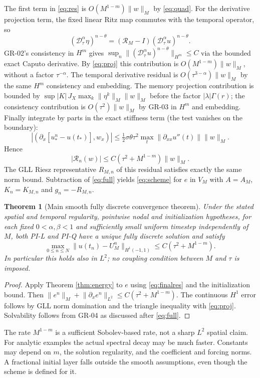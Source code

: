 \documentclass[11pt,a4paper]{article}
\newtheorem{theorem}{Theorem}
\newcommand{\norm}[1]{\lVert#1\rVert}
\newcommand{\D}{\mathcal D_\tau^\alpha}
\begin{document}
The first term in \eqref{eq:res} is $O(M^{1-m})\norm{w}_M$ by \eqref{eq:quad}. For the derivative projection term, the fixed linear Ritz map commutes with the temporal operator, so
\[
 (\D\eta)^{n-\theta}=(\mathcal R_M-I)(\D u)^{n-\theta}.
\]
GR-02's consistency in $H^m$ gives $\sup_n\norm{(\D u)^{n-\theta}}_{H^m}\le C$ via the bounded exact Caputo derivative. By \eqref{eq:proj} this contribution is $O(M^{1-m})\norm{w}_M$, without a factor $\tau^{-\alpha}$. The temporal derivative residual is $O(\tau^{3-\alpha})\norm{w}_M$ by the same $H^m$ consistency and embedding. The memory projection contribution is bounded by $\sup|K|\,J_X\max_k\norm{\eta^k}_M\norm{w}_M$ before the factor $|\lambda|\Gamma(r)$; the consistency contribution is $O(\tau^2)\norm{w}_M$ by GR-03 in $H^m$ and embedding. Finally integrate by parts in the exact stiffness term (the test vanishes on the boundary):
\[
 |(\partial_x[u_*^n-u(t_*)],w_x)|
 \le\tfrac12\sigma\theta\tau^2\max_t\norm{\partial_{xx}u''(t)}\norm{w}_M.
\]
Hence
\begin{equation}\label{eq:finalres}
 |\mathcal R_n(w)|\le C(\tau^2+M^{1-m})\norm{w}_M.
\end{equation}
The GLL Riesz representative $R_{M,n}$ of this residual satisfies exactly the same norm bound. Subtraction of \eqref{eq:full} yields \eqref{eq:scheme} for $e$ in $V_M$ with $A=A_M$, $K_n=K_{M,n}$ and $g_n=-R_{M,n}$.
\begin{theorem}[Main smooth fully discrete convergence theorem]\label{thm:full}
Under the stated spatial and temporal regularity, pointwise nodal and initialization hypotheses, for each fixed $0<\alpha,\beta<1$ and sufficiently small uniform timestep independently of $M$, both PI-L and PI-Q have a unique fully discrete solution and satisfy
\[
 \max_{0\le n\le N}\norm{u(t_n)-U_M^n}_{H^1(-1,1)}
 \le C(\tau^2+M^{1-m}).
\]
In particular this holds also in $L^2$; no coupling condition between $M$ and $\tau$ is imposed.
\end{theorem}
\begin{proof}
Apply Theorem \ref{thm:energy} to $e$ using \eqref{eq:finalres} and the initialization bound. Then $\norm{e^n}_M+\norm{\partial_x e^n}_{L^2}\le C(\tau^2+M^{1-m})$. The continuous $H^1$ error follows by GLL norm domination and the triangle inequality with \eqref{eq:proj}. Solvability follows from GR-04 as discussed after \eqref{eq:full}.
\end{proof}
The rate $M^{1-m}$ is a sufficient Sobolev-based rate, not a sharp $L^2$ spatial claim. For analytic examples the actual spectral decay may be much faster. Constants may depend on $m$, the solution regularity, and the coefficient and forcing norms. A fractional initial layer falls outside the smooth assumptions, even though the scheme is defined for it.
\end{document}
